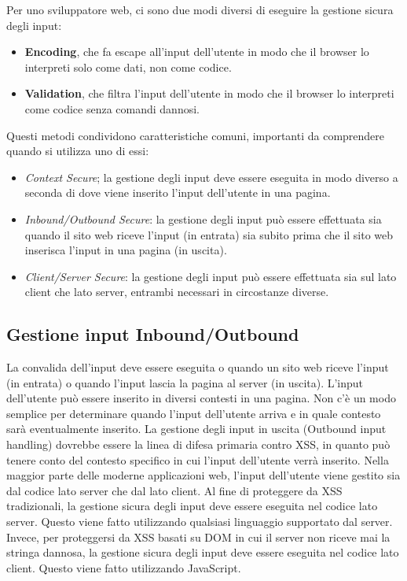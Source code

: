 Per uno sviluppatore web, ci sono due modi diversi di eseguire la gestione sicura
degli input:

\begin{itemize}
      \item \textbf{Encoding}, che fa escape all'input dell'utente in modo che
            il browser lo interpreti solo
            come dati, non come codice.
      \item \textbf{Validation}, che filtra l'input dell'utente in modo che il
            browser lo interpreti come codice
            senza comandi dannosi.
\end{itemize}

Questi metodi condividono caratteristiche comuni, importanti da comprendere
quando si utilizza uno di essi:

\begin{itemize}
      \item \textit{Context Secure}; la gestione degli input deve essere eseguita
            in modo diverso a
            seconda di dove viene inserito l'input dell'utente in una pagina.
      \item \textit{Inbound/Outbound Secure}: la gestione degli input può essere
            effettuata sia quando il
            sito web riceve l'input (in entrata) sia subito prima che il
            sito web
            inserisca l'input in una pagina (in uscita).
      \item \textit{Client/Server Secure}: la gestione degli input può essere
            effettuata sia sul lato client
            che lato server, entrambi necessari in circostanze diverse.
\end{itemize}

\subsection{Gestione input Inbound/Outbound}

La convalida dell'input deve essere eseguita o quando un sito web riceve l'input
(in entrata)
o quando l'input lascia la pagina al server (in uscita).
L'input dell'utente può essere inserito in diversi contesti in una pagina.
Non c'è un modo
semplice per determinare quando l'input dell'utente arriva e in quale contesto sarà
eventualmente inserito. La gestione degli input in uscita (Outbound input handling)
dovrebbe
essere la linea di difesa primaria contro XSS, in quanto può tenere conto del
contesto
specifico in cui l'input dell'utente verrà inserito.
Nella maggior parte delle moderne applicazioni web, l'input dell'utente viene
gestito sia dal
codice lato server che dal lato client.
Al fine di proteggere da XSS tradizionali, la gestione sicura degli input deve
essere
eseguita nel codice lato server. Questo viene fatto utilizzando qualsiasi linguaggio
supportato dal server. Invece, per proteggersi da XSS basati su DOM in cui il
server non riceve mai la stringa
dannosa, la gestione sicura degli input deve essere eseguita nel codice lato client.
Questo viene fatto utilizzando JavaScript.

